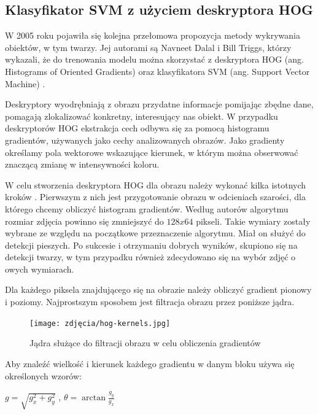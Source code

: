 
\subsection{Klasyfikator SVM z użyciem deskryptora HOG}
\label{sec:svmhog}
W 2005 roku pojawiła się kolejna przełomowa propozycja metody wykrywania obiektów, w tym twarzy. Jej autorami są Navneet Dalal i Bill Triggs, którzy wykazali, że do trenowania modelu można skorzystać z deskryptora HOG (ang. Histograms of Oriented Gradients) oraz klasyfikatora SVM (ang. Support Vector Machine) \cite{hog}. 

Deskryptory wyodrębniają z obrazu przydatne informacje pomijając zbędne dane, pomagają zlokalizować konkretny, interesujący nas obiekt. W przypadku deskryptorów HOG  ekstrakcja cech odbywa się za pomocą histogramu gradientów, używanych jako cechy analizowanych obrazów. Jako gradienty określamy pola wektorowe wskazujące kierunek, w którym można obserwować znaczącą zmianę w intensywności koloru.

W celu stworzenia deskryptora HOG dla obrazu należy wykonać kilka istotnych kroków \cite{hog2}. Pierwszym z nich jest przygotowanie obrazu w odcieniach szarości, dla którego chcemy obliczyć histogram gradientów. Według autorów algorytmu rozmiar zdjęcia powinno się zmniejszyć do $128x64$ pikseli. Takie wymiary zostały wybrane ze względu na początkowe przeznaczenie algorytmu. Miał on służyć do detekcji pieszych. Po sukcesie i otrzymaniu dobrych wyników, skupiono się na detekcji twarzy, w tym przypadku również zdecydowano się na wybór zdjęć o owych wymiarach.

Dla każdego piksela znajdującego się na obrazie należy obliczyć gradient pionowy i poziomy. Najprostszym sposobem jest filtracja obrazu przez poniższe jądra.

\begin{figure}[h]
	\centering
	\texttt{[image: zdjęcia/hog-kernels.jpg]}
	\caption{Jądra służące do filtracji obrazu w celu obliczenia gradientów \cite{hog2}} 
	\label{fig:hogKernels}
\end{figure}

Aby znaleźć wielkość i kierunek każdego gradientu w danym bloku używa się określonych wzorów:
\begin{center}
    $g=\sqrt{g_{x}^{2}+g_{y}^{2}}$ ,
    $\theta=\arctan \frac{g_{y}}{g_{x}}$
\end{center}

